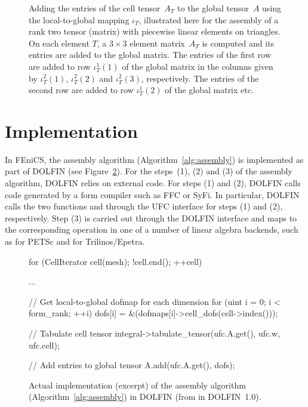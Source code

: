 \begin{figure}
\centering
  \caption{Adding the entries of the cell tensor~$A_T$ to the global
    tensor~$A$ using the local-to-global mapping $\iota_T$,
    illustrated here for the assembly of a rank two tensor (matrix)
    with piecewise linear elements on triangles. On each element
    $T$, a $3 \times 3$ element matrix~$A_T$ is computed and its
    entries are added to the global matrix. The entries of the first
    row are added to row $\iota^1_T(1)$ of the global matrix in the
    columns given by $\iota^2_T(1)$, $\iota^2_T(2)$ and
    $\iota^2_T(3)$, respectively. The entries of the second row are
    added to row $\iota^1_T(2)$ of the global matrix etc.}
  \label{fig:insertion}
\end{figure}

\section{Implementation}

In FEniCS, the assembly algorithm (Algorithm~\ref{alg:assembly}) is
implemented as part of DOLFIN (see
Figure~\ref{fig:assembly,code}). For the steps~(1), (2) and (3) of the
assembly algorithm, DOLFIN relies on external code. For steps (1) and
(2), DOLFIN calls code generated by a form compiler such as FFC or
SyFi. In particular, DOLFIN calls the two functions
 and  through the UFC
interface for steps (1) and (2), respectively. Step (3) is carried out
through the DOLFIN  interface and maps to the
corresponding operation in one of a number of linear algebra backends,
such as  for PETSc and 
for Trilinos/Epetra.\enlargethispage{5pt}

\begin{figure}
\bwfig
  \begin{c++}
for (CellIterator cell(mesh); !cell.end(); ++cell)
{
  ...

  // Get local-to-global dofmap for each dimension
  for (uint i = 0; i < form_rank; ++i)
    dofs[i] = &(dofmaps[i]->cell_dofs(cell->index()));

  // Tabulate cell tensor
  integral->tabulate_tensor(ufc.A.get(),
                            ufc.w,
                            ufc.cell);

  // Add entries to global tensor
  A.add(ufc.A.get(), dofs);
}
\end{c++}
  \caption{Actual implementation (excerpt) of the assembly algorithm
    (Algorithm~\ref{alg:assembly}) in DOLFIN (from 
    in DOLFIN~1.0).}
  \label{fig:assembly,code}
\end{figure}

